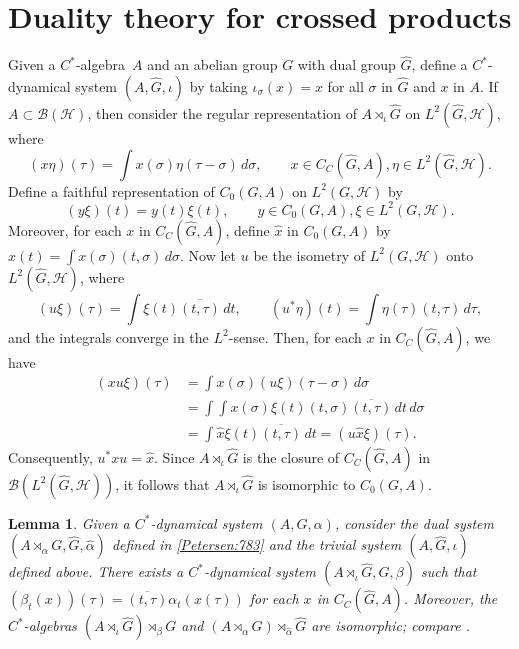 \documentclass{book}
\newtheorem{lemma}[definition]{Lemma}
\def\cstar{\(C^*\)-algebra}
\begin{document}
\section{Duality theory for crossed products}
Given a \cstar\ \(A\) and an abelian group \(G\) with dual group \(\hat{G}\), define a \(C^*\)-dynamical system
\((A,\hat{G},\iota)\) by taking \(\iota_\sigma(x)=x\) for all \(\sigma\) in \(\hat{G}\) and \(x\) in \(A\).
If \(A\subset \mathcal{B}(\mathcal{H})\), then consider the regular representation of \(A\rtimes_\iota\hat{G}\) on \(L^2(\hat{G},\mathcal{H})\), where
\[
  (x\eta)(\tau)=\int x(\sigma)\eta(\tau-\sigma)\,d\sigma,\qquad x\in C_C(\hat{G},A),\eta\in L^2(\hat{G},\mathcal{H}).
\]
Define a faithful representation of \(C_0(G,A)\) on \(L^2(G,\mathcal{H})\) by
\[
  (y\xi)(t)=y(t)\xi(t),\qquad y\in C_0(G,A), \xi\in L^2(G,\mathcal{H}).
\]
Moreover, for each \(x\) in \(C_C(\hat{G},A)\), define \(\hat{x}\) in \(C_0(G,A)\) by \(\hat{x}(t)=\int x(\sigma)(t,\sigma)\,d\sigma\).\label{Petersen:791}
Now let \(u\) be the isometry of \(L^2(G,\mathcal{H})\) onto \(L^2(\hat{G},\mathcal{H})\), where
\[
  (u\xi)(\tau)=\int\xi(t)\overline{(t,\tau)}\,dt,\qquad(u^* \eta)(t)=\int\eta(\tau)(t,\tau)\,d\tau,
\]
and the integrals converge in the \(L^2\)-sense. Then, for each \(x\) in \(C_C(\hat{G},A)\), we have
\begin{align*}
  (xu\xi)(\tau)&=\int x(\sigma)(u\xi)(\tau-\sigma)\,d\sigma\\
    &=\int\int x(\sigma)\xi(t)(t,\sigma)\overline{(t,\tau)}\,dt\,d\sigma\\
  &=\int\hat{x}\xi(t)\overline{(t,\tau)}\,dt=(u\hat{x}\xi)(\tau).
\end{align*}
Consequently, \(u^* x u=\hat{x}\). Since \(A\rtimes_\iota\hat{G}\) is the closure of \(C_C(\hat{G},A)\) in \(\mathcal{B}(L^2(\hat{G},\mathcal{H}))\),
it follows that \(A\rtimes_\iota\hat{G}\) is isomorphic to \(C_0(G,A)\).
\begin{lemma}\label{Petersen:792}
  Given a \(C^*\)-dynamical system \((A,G,\alpha)\), consider the dual system \((A\rtimes_\alpha G,\hat{G},\hat{\alpha})\)
  defined in \ref{Petersen:783} and the trivial system \((A,\hat{G},\iota)\) defined above.
  There exists a \(C^*\)-dynamical system \((A\rtimes_\iota\hat{G},G,\beta)\) such that \((\beta_t(x))(\tau)=\overline{(t,\tau)}\alpha_t(x(\tau))\)
  for each \(x\) in \(C_C(\hat{G},A)\). Moreover, the \(C^*\)-algebras \((A\rtimes_\iota\hat{G})\rtimes_\beta G\) and
  \((A\rtimes_\alpha G)\rtimes_{\hat{\alpha}}\hat{G}\) are isomorphic; compare
  \cite[Lemmas 7.2 and 7.3]{Williams2007}.
\end{lemma}
\end{document}
